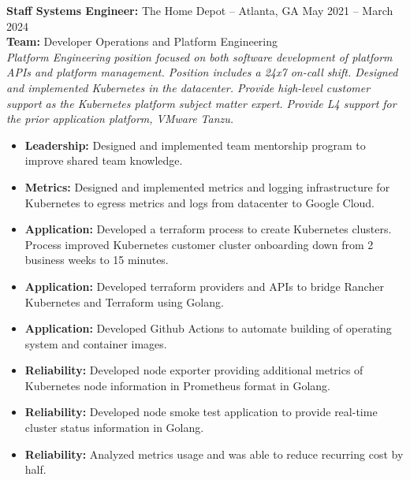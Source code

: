 \documentclass[11pt]{article}       %
\begin{document}
\begin{description}
\item\textbf{Staff Systems Engineer:} {The Home Depot} -- Atlanta, GA \hfill May 2021 -- March 2024 \\
\textbf{Team:} Developer Operations and Platform Engineering \\
\textit{Platform Engineering position focused on both software development of platform APIs and platform management. Position includes a 24x7 on-call shift. Designed and implemented Kubernetes in the datacenter. Provide high-level customer support as the Kubernetes platform subject matter expert. Provide L4 support for the prior application platform, VMware Tanzu.} \\
\vspace{-6.5pt}
\begin{itemize}
  \item \textbf{Leadership:} Designed and implemented team mentorship program to improve shared team knowledge.
  \item \textbf{Metrics:} Designed and implemented metrics and logging infrastructure for Kubernetes to egress metrics and logs from datacenter to Google Cloud.
  \item \textbf{Application:} Developed a terraform process to create Kubernetes clusters. Process improved Kubernetes customer cluster onboarding down from 2 business weeks to 15 minutes.
  \item \textbf{Application:} Developed terraform providers and APIs to bridge Rancher Kubernetes and Terraform using Golang.
  \item \textbf{Application:} Developed Github Actions to automate building of operating system and container images.
  \item \textbf{Reliability:} Developed node exporter providing additional metrics of Kubernetes node information in Prometheus format in Golang.
  \item \textbf{Reliability:} Developed node smoke test application to provide real-time cluster status information in Golang.
  \item \textbf{Reliability:} Analyzed metrics usage and was able to reduce recurring cost by half.
\end{itemize}
\end{description}
\end{document}
